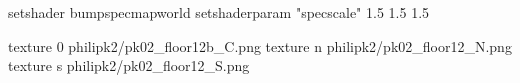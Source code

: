 setshader bumpspecmapworld
setshaderparam "specscale" 1.5 1.5 1.5

texture 0 philipk2/pk02_floor12b_C.png
texture n philipk2/pk02_floor12_N.png
texture s philipk2/pk02_floor12_S.png

